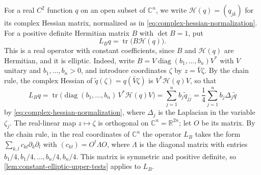 For a real $C^2$ function $q$ on an open subset of $\mathbb C^n$, we write $\mathcal H(q)=(q_{j\bar k})$ for its complex Hessian matrix, normalized as in \eqref{eq:complex-hessian-normalization}. For a positive definite Hermitian matrix $B$ with $\det B=1$, put
\[
 L_Bq=\operatorname{tr}\bigl(B\mathcal H(q)\bigr).
\]
This is a real operator with constant coefficients, since $B$ and $\mathcal H(q)$ are Hermitian, and it is elliptic. Indeed, write $B=V\operatorname{diag}(b_1,\ldots,b_n)V^*$ with $V$ unitary and $b_1,\ldots,b_n>0$, and introduce coordinates $\zeta$ by $z=\bar V\zeta$. By the chain rule, the complex Hessian of $\tilde q(\zeta)=q(\bar V\zeta)$ is $V^*\mathcal H(q)V$, so that
\[
 L_Bq=\operatorname{tr}\bigl(\operatorname{diag}(b_1,\ldots,b_n)\,V^*\mathcal H(q)V\bigr)=\sum_{j=1}^nb_j\tilde q_{j\bar j}=\frac14\sum_{j=1}^nb_j\Delta_j\tilde q
\]
by \eqref{eq:complex-hessian-normalization}, where $\Delta_j$ is the Laplacian in the variable $\zeta_j$. The real-linear map $z\mapsto\zeta$ is orthogonal on $\mathbb C^n=\mathbb R^{2n}$; let $O$ be its matrix. By the chain rule, in the real coordinates of $\mathbb C^n$ the operator $L_B$ takes the form $\sum_{k,l}c_{kl}\partial_k\partial_l$ with $(c_{kl})=O^t\Lambda O$, where $\Lambda$ is the diagonal matrix with entries $b_1/4,b_1/4,\ldots,b_n/4,b_n/4$. This matrix is symmetric and positive definite, so \cref{lem:constant-elliptic-upper-tests} applies to $L_B$.

